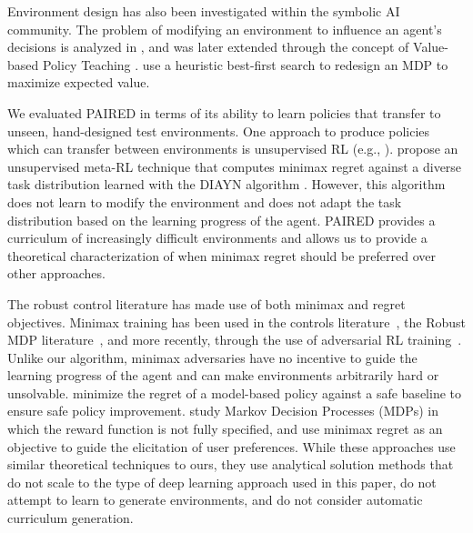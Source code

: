 \documentclass{article}
\begin{document}
Environment design has also been investigated within the symbolic AI community. The problem of modifying an environment to influence an agent's decisions is analyzed in \citet{zhang2009general}, and was later extended through the concept of Value-based Policy Teaching \cite{zhang2008value}.
\citet{keren2017equi,keren2019efficient} use a heuristic best-first search to redesign an MDP to maximize expected value.

We evaluated PAIRED in terms of its ability to learn policies that transfer to unseen, hand-designed test environments.
One approach to produce policies which can transfer between environments is unsupervised RL (e.g., \citep{schmidhuber2010formal,sermanet2018time}). %
\citet{gupta2018unsupervised} propose an unsupervised meta-RL technique that computes minimax regret against a diverse task distribution learned with the DIAYN algorithm \citep{eysenbach2018diversity}. However, this algorithm does not learn to modify the environment and does not adapt the task distribution based on the learning progress of the agent. PAIRED provides a curriculum of increasingly difficult environments and allows us to provide a theoretical characterization of when minimax regret should be preferred over other approaches. 


The robust control literature has made use of both minimax and regret objectives.
Minimax training has been used in the controls literature~\citep{slotine1987adaptive, aastrom1983theory,zhou1996robust}, the Robust MDP literature~\citep{bagnell2001solving, iyengar2005robust,nilim2005robust,tamar2014scaling}, and more recently, through the use of adversarial RL training~\cite{pinto2017supervision,vinitsky2020dmalt,morimoto2001robust}. 
Unlike our algorithm, minimax adversaries have no incentive to guide the learning progress of the agent and can make environments arbitrarily hard or unsolvable. 
\citet{ghavamzadeh2016safe} minimize the regret of a model-based policy against a safe baseline to ensure safe policy improvement. \citet{regan2011robust,regan2012regret} study Markov Decision Processes (MDPs) in which the reward function is not fully specified, and use minimax regret as an objective to guide the elicitation of user preferences. While these approaches use similar theoretical techniques to ours, they use analytical solution methods that do not scale to the type of deep learning approach used in this paper, do not attempt to learn to generate environments, and do not consider automatic curriculum generation.
\end{document}
